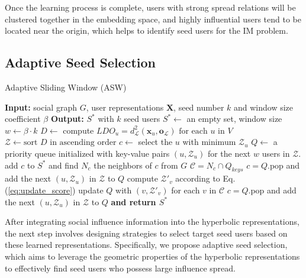 Once the learning process is complete, users with strong spread relations will be clustered together in the embedding space, and highly influential users tend to be located near the origin, which helps to identify seed users for the IM problem.

\subsection{Adaptive Seed Selection} 
\begin{algorithm}[H]
\caption{Adaptive Sliding Window (ASW)}\label{alg:ASW}
\begin{algorithmic}[1]
\Statex \textbf{Input:} social graph $G$, user representations $\mathbf{X}$, seed number $k$ and window size coefficient $\beta$ 
\Statex \textbf{Output:} $S^*$ with $k$ seed users
\State $S^* \gets$ an empty set, window size $w \gets \beta \cdot k$
\State $D \gets$ compute $ LDO_u = d^2_{\mathcal{L}}(\mathbf{x}_u, \mathbf{o}_{\mathcal{L}}) \text{ for each } u \text{ in } V$ 
\State $\mathcal{Z} \gets \text{sort } D  \text{ in ascending order} $
\State $c \gets$ select the $u$ with minimum $\mathcal{Z}_u$
\State $Q \gets$ a priority queue initialized with key-value pairs $(u, \mathcal{Z}_u)$ for the next $w$ users in $\mathcal{Z}$.
\State add $c$ to $S^*$ and find $N_c$ the neighbors of $c$ from $G$
\State $\mathcal{C} = N_c \cap Q_{keys}$
\State $c = Q.$pop and add the next $(u, \mathcal{Z}_u)$ in $\mathcal{Z}$ to $Q$ 
\Else
\State compute $\mathcal{Z}'_v$ according to Eq. (\ref{eq:update_score}) 
\State update $Q$ with $(v, \mathcal{Z}'_v)$ for each $v$ in $\mathcal{C}$
\State $c = Q.$pop and add the next $(u, \mathcal{Z}_u)$ in $\mathcal{Z}$ to $Q$ 
\EndIf
\EndWhile \textbf{ and return $S^*$} 
\end{algorithmic}
\end{algorithm}

After integrating social influence information into the hyperbolic representations, the next step involves designing strategies to select target seed users based on these learned representations. Specifically, we propose adaptive seed selection, which aims to leverage the geometric properties of the hyperbolic representations to effectively find seed users who possess large influence spread.

